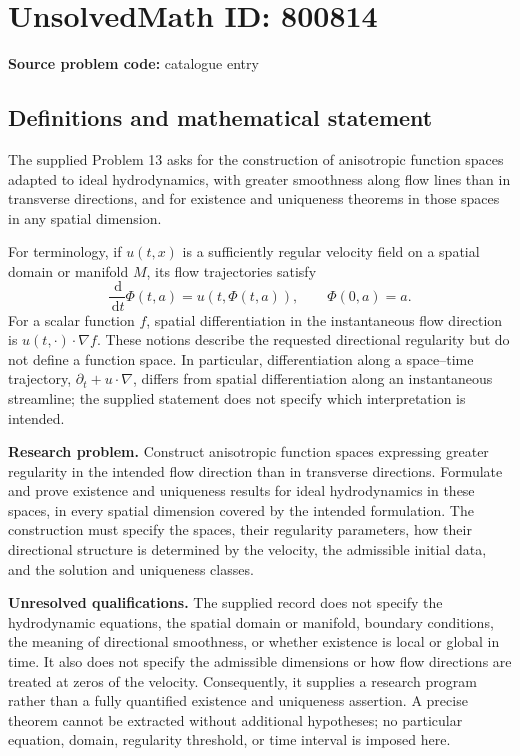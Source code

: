 \documentclass[11pt]{article}
\newcommand{\dd}{\,\mathrm{d}}
\begin{document}
\section*{UnsolvedMath ID: 800814}
\textbf{Source problem code:} catalogue entry
\subsection{Definitions and mathematical statement}
The supplied Problem 13 asks for the construction of anisotropic function spaces adapted to ideal hydrodynamics, with greater smoothness along flow lines than in transverse directions, and for existence and uniqueness theorems in those spaces in any spatial dimension.

For terminology, if \(u(t,x)\) is a sufficiently regular velocity field on a spatial domain or manifold \(M\), its flow trajectories satisfy
\[
\frac{\dd}{\dd t}\Phi(t,a)=u(t,\Phi(t,a)),\qquad \Phi(0,a)=a.
\]
For a scalar function \(f\), spatial differentiation in the instantaneous flow direction is \(u(t,\cdot)\cdot\nabla f\). These notions describe the requested directional regularity but do not define a function space. In particular, differentiation along a space--time trajectory, \(\partial_t+u\cdot\nabla\), differs from spatial differentiation along an instantaneous streamline; the supplied statement does not specify which interpretation is intended.

\textbf{Research problem.} Construct anisotropic function spaces expressing greater regularity in the intended flow direction than in transverse directions. Formulate and prove existence and uniqueness results for ideal hydrodynamics in these spaces, in every spatial dimension covered by the intended formulation. The construction must specify the spaces, their regularity parameters, how their directional structure is determined by the velocity, the admissible initial data, and the solution and uniqueness classes.

\textbf{Unresolved qualifications.} The supplied record does not specify the hydrodynamic equations, the spatial domain or manifold, boundary conditions, the meaning of directional smoothness, or whether existence is local or global in time. It also does not specify the admissible dimensions or how flow directions are treated at zeros of the velocity. Consequently, it supplies a research program rather than a fully quantified existence and uniqueness assertion. A precise theorem cannot be extracted without additional hypotheses; no particular equation, domain, regularity threshold, or time interval is imposed here.
\end{document}
